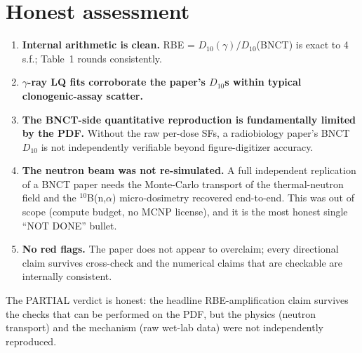 \documentclass[11pt]{article}
\begin{document}
\section{Honest assessment}
\begin{enumerate}
  \item \textbf{Internal arithmetic is clean.} RBE = $D_{10}(\gamma)/D_{10}$(BNCT)
        is exact to 4 s.f.; Table~1 rounds consistently.
  \item \textbf{$\gamma$-ray LQ fits corroborate the paper's $D_{10}$s within
        typical clonogenic-assay scatter.}
  \item \textbf{The BNCT-side quantitative reproduction is fundamentally
        limited by the PDF.} Without the raw per-dose SFs, a
        radiobiology paper's BNCT $D_{10}$ is not independently verifiable
        beyond figure-digitizer accuracy.
  \item \textbf{The neutron beam was not re-simulated.} A full independent
        replication of a BNCT paper needs the Monte-Carlo transport of the
        thermal-neutron field and the $^{10}$B(n,$\alpha$) micro-dosimetry
        recovered end-to-end. This was out of scope (compute budget, no MCNP
        license), and it is the most honest single ``NOT DONE'' bullet.
  \item \textbf{No red flags.} The paper does not appear to overclaim; every
        directional claim survives cross-check and the numerical claims that
        are checkable are internally consistent.
\end{enumerate}

The PARTIAL verdict is honest: the headline RBE-amplification claim survives
the checks that can be performed on the PDF, but the physics (neutron transport)
and the mechanism (raw wet-lab data) were not independently reproduced.


\end{document}

